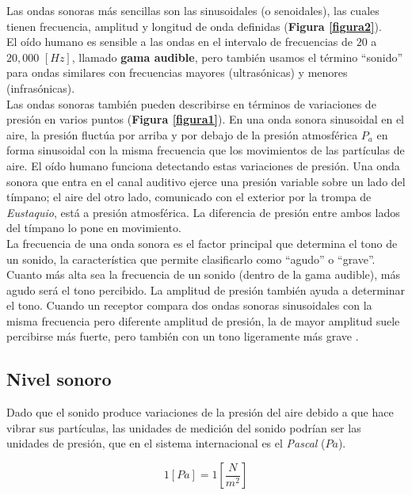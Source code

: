 \documentclass[letter,11pt]{article}
\begin{document}
Las ondas sonoras más sencillas son las sinusoidales (o senoidales), las cuales
tienen frecuencia, amplitud y longitud de onda definidas
(\textbf{Figura \ref{figura2}}).
\\

El oído humano es sensible a las ondas en el intervalo de frecuencias de $20$ a
$20,000$ $[Hz]$, llamado \textbf{gama audible}, pero también usamos el término
``sonido'' para ondas similares con frecuencias mayores (ultrasónicas) y menores
(infrasónicas).
\\

Las ondas sonoras también pueden describirse en términos de variaciones de
presión en varios puntos (\textbf{Figura \ref{figura1}}). En una onda sonora
sinusoidal en el aire, la presión fluctúa por arriba y por debajo de la presión
atmosférica $P_a$ en forma sinusoidal con la misma frecuencia que los
movimientos de las partículas de aire. El oído humano funciona detectando estas
variaciones de presión. Una onda sonora que entra en el canal auditivo ejerce
una presión variable sobre un lado del tímpano; el aire del otro lado,
comunicado con el exterior por la trompa de \emph{Eustaquio}, está a presión
atmosférica. La diferencia de presión entre ambos lados del tímpano lo pone en
movimiento.
\\

La frecuencia de una onda sonora es el factor principal que determina el tono de
un sonido, la característica que permite clasificarlo como ``agudo'' o
``grave''. Cuanto más alta sea la frecuencia de un sonido (dentro de la gama
audible), más agudo será el tono percibido. La amplitud de presión también ayuda
a determinar el tono. Cuando un receptor compara dos ondas sonoras sinusoidales
con la misma frecuencia pero diferente amplitud de presión, la de mayor amplitud
suele percibirse más fuerte, pero también con un tono ligeramente más grave
\cite{Young&Freedman}.

\subsection{Nivel sonoro}

Dado que el sonido produce variaciones de la presión del aire debido a que hace
vibrar sus partículas, las unidades de medición del sonido podrían ser las
unidades de presión, que en el sistema internacional es el \emph{Pascal} ($Pa$).

\begin{equation*}
    1 [Pa] = 1 \left[\frac{N}{m^2}\right]
\end{equation*}
\vspace{0.10cm}
\end{document}
